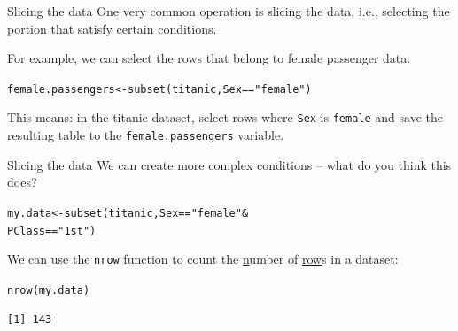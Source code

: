 \documentclass{beamer}\usepackage[]{graphicx}\usepackage[]{color}
\makeatletter
\newcommand{\hlstr}[1]{\textcolor[rgb]{1,0.894,0.71}{#1}}%
\newcommand{\hlopt}[1]{\textcolor[rgb]{1,0.894,0.769}{#1}}%
\newcommand{\hlstd}[1]{\textcolor[rgb]{1,0.894,0.769}{#1}}%
\newcommand{\hlkwb}[1]{\textcolor[rgb]{0.804,0.776,0.451}{#1}}%
\newcommand{\hlkwd}[1]{\textcolor[rgb]{1,0.78,0.769}{#1}}%
\newenvironment{kframe}{%
 \def\at@end@of@kframe{}%
 \ifinner\ifhmode%
  \def\at@end@of@kframe{\end{minipage}}%
  \begin{minipage}{\columnwidth}%
 \fi\fi%
 \def\FrameCommand##1{\hskip\@totalleftmargin \hskip-\fboxsep
 \colorbox{shadecolor}{##1}\hskip-\fboxsep
     \hskip-\linewidth \hskip-\@totalleftmargin \hskip\columnwidth}%
 \MakeFramed {\advance\hsize-\width
   \@totalleftmargin\z@ \linewidth\hsize
   \@setminipage}}%
 {\par\unskip\endMakeFramed%
 \at@end@of@kframe}
\newenvironment{knitrout}{}{} %
\makeatother
\begin{document}
\begin{darkframes}
    \begin{frame}[fragile]{Slicing the data}
      One very common operation is slicing the data, i.e., selecting the portion that satisfy certain conditions. \pause

      \bigskip
      For example, we can select the rows that belong to female passenger data.
\begin{knitrout}
\begin{kframe}
\begin{alltt}
\hlstd{female.passengers} \hlkwb{<-} \hlkwd{subset}\hlstd{(titanic, Sex} \hlopt{==} \hlstr{"female"}\hlstd{)}
\end{alltt}
\end{kframe}
\end{knitrout}
      \pause

      This means: in the titanic dataset, select rows where \verb|Sex| is \verb|female| and save the resulting table to the \verb|female.passengers| variable.

    \end{frame}




    \begin{frame}[fragile]{Slicing the data}
      We can create more complex conditions -- what do you think this does?

\begin{knitrout}
\begin{kframe}
\begin{alltt}
\hlstd{my.data} \hlkwb{<-} \hlkwd{subset}\hlstd{(titanic, Sex} \hlopt{==} \hlstr{"female"} \hlopt{&}
                           \hlstd{PClass} \hlopt{==} \hlstr{"1st"}\hlstd{)}
\end{alltt}
\end{kframe}
\end{knitrout}

      \pause

      We can use the \verb|nrow| function to count the \underline{n}umber of \underline{row}s in a dataset:

\begin{knitrout}
\begin{kframe}
\begin{alltt}
\hlkwd{nrow}\hlstd{(my.data)}
\end{alltt}
\begin{verbatim}
[1] 143
\end{verbatim}
\end{kframe}
\end{knitrout}


\end{frame}
\end{darkframes}
\end{document}
